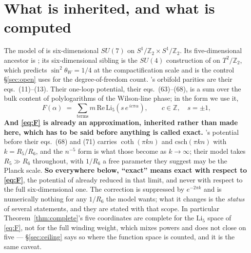 \documentclass[11pt,a4paper]{article}
\newcommand{\ZZ}{\mathbb{Z}}
\newcommand{\su}[1]{SU(#1)}
\begin{document}
\section{What is inherited, and what is computed}\label{sec:setting}

The model of \cite{KM25} is six-dimensional $\su7$ on $S^1/\ZZ_2\times S^1/\ZZ_2$. Its
five-dimensional ancestor is \cite{KTY17}; its six-dimensional sibling is the $\su4$
construction of \cite{AHMN} on $T^2/\ZZ_2$, which predicts $\sin^2\theta_W = 1/4$ at the
compactification scale and is the control \S\ref{sec:open} uses for the degree-of-freedom
count. \cite{KM25}'s orbifold parities are their
eqs.~(11)--(13). Their one-loop potential, their eqs.~(63)--(68), is a sum over the bulk content of
polylogarithms of the Wilson-line phase; in the form we use it,
\begin{equation}\label{eq:F}
  F(\alpha)\;=\;\sum_{\text{terms}} m\,\mathrm{Re}\,\mathrm{Li}_5\!\left(s\,e^{\,i c \pi \alpha}\right),
  \qquad c\in\ZZ,\quad s=\pm1,
\end{equation}
\noindent \textbf{And \eqref{eq:F} is already an approximation, inherited rather than made here,
which has to be said before anything is called exact.} \cite{KM25}'s potential before their
eqs.~(68) and (71) carries $\coth(\pi k n)$ and $\mathrm{csch}(\pi k n)$ with
$k=R_5/R_6$, and the $n^{-5}$ form is what those become as $k\to\infty$; their model takes
$R_5\gg R_6$ throughout, with $1/R_6$ a free parameter they suggest may be the Planck scale.
\textbf{So everywhere below, ``exact'' means exact with respect to \eqref{eq:F}}, the potential of
\cite{KM25} already reduced in that limit, and never with respect to the full six-dimensional one.
The correction is suppressed by $e^{-2\pi k}$ and is numerically nothing for any $1/R_6$ the model
wants; what it changes is the \emph{status} of several statements, and they are stated with that
scope. In particular Theorem~\ref{thm:complete}'s five coordinates are complete for the $\mathrm{Li}_5$
space of \eqref{eq:F}, not for the full winding weight, which mixes powers and does not close on
five --- \S\ref{sec:ceiling} says so where the function space is counted, and it is the same caveat.
\end{document}
